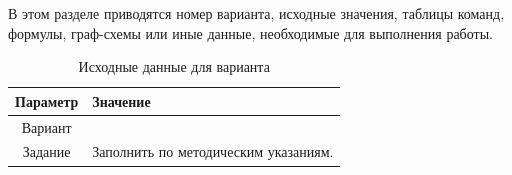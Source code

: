 \labinitialdata

В этом разделе приводятся номер варианта, исходные значения, таблицы команд,
формулы, граф-схемы или иные данные, необходимые для выполнения работы.

\begin{table}[H]
  \caption{Исходные данные для варианта }
  \begin{tabular}{|c|p{10cm}|}
    \hline
    Параметр & Значение \\
    \hline
    Вариант &  \\
    \hline
    Задание & Заполнить по методическим указаниям. \\
    \hline
  \end{tabular}
\end{table}

